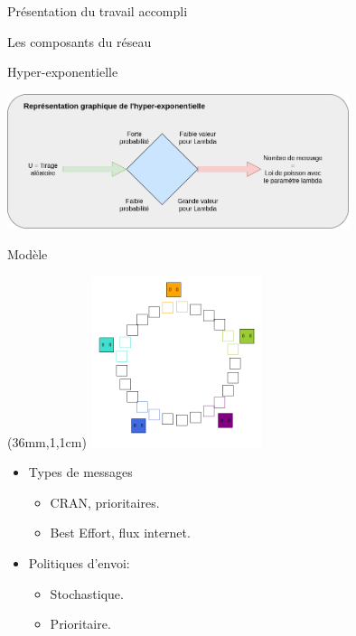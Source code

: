 \documentclass[10 pt]{beamer}
\begin{document}
\begin{section}{Pr\'esentation du travail accompli}
\begin{subsection}{Les composants du r\'eseau}
\begin{frame}{Hyper-exponentielle}
\begin{center}
\includegraphics [width=100mm]{images/hyper_expo.png}
\end{center}
\end{frame}


\begin{frame}{Mod\`ele}
\begin{textblock*}{5cm}(36mm,1,1cm) %
\includegraphics [width=5cm]{logos/anneau_en_action.png}
\end{textblock*}


\vspace{4cm}


 \begin{multicols}{2}
\begin{itemize}
\item Types de messages
\begin{itemize}
\item CRAN, prioritaires.
\item Best Effort, flux internet.
\end{itemize}
\item Politiques d'envoi:
\begin{itemize}
\item Stochastique.
\item Prioritaire.
\end{itemize}
\end{itemize}
\end{multicols}


\end{frame}




\end{subsection}
\end{section}
\end{document}
